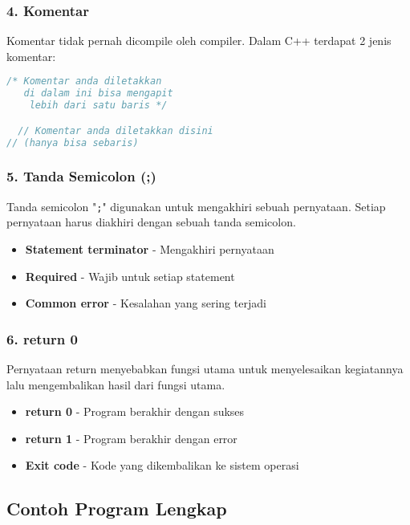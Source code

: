 \subsubsection{4. Komentar}

Komentar tidak pernah dicompile oleh compiler. Dalam C++ terdapat 2 jenis komentar:

\begin{lstlisting}[language=c++, numbers=none]
  /* Komentar anda diletakkan
   di dalam ini bisa mengapit
    lebih dari satu baris */

  // Komentar anda diletakkan disini
// (hanya bisa sebaris)
\end{lstlisting}

\subsubsection{5. Tanda Semicolon (;)}

Tanda semicolon "\texttt{;}" digunakan untuk mengakhiri sebuah pernyataan. Setiap pernyataan harus diakhiri dengan sebuah tanda semicolon.

\begin{itemize}
\item \textbf{Statement terminator} - Mengakhiri pernyataan
\item \textbf{Required} - Wajib untuk setiap statement
\item \textbf{Common error} - Kesalahan yang sering terjadi
\end{itemize}

\subsubsection{6. return 0}

Pernyataan return menyebabkan fungsi utama untuk menyelesaikan kegiatannya lalu mengembalikan hasil dari fungsi utama.

\begin{itemize}
\item \textbf{return 0} - Program berakhir dengan sukses
\item \textbf{return 1} - Program berakhir dengan error
\item \textbf{Exit code} - Kode yang dikembalikan ke sistem operasi
\end{itemize}

\subsection{Contoh Program Lengkap}

